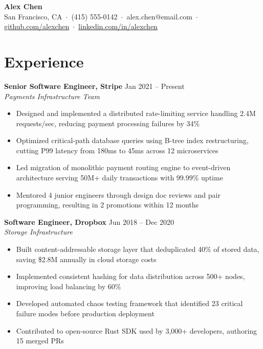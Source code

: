 \documentclass[11pt,letterpaper]{article}
\begin{document}
\begin{center}
{\LARGE \textbf{Alex Chen}} \\[4pt]
{\small San Francisco, CA \,$\cdot$\, (415) 555-0142 \,$\cdot$\, alex.chen@email.com \,$\cdot$\, \href{https://github.com/alexchen}{github.com/alexchen} \,$\cdot$\, \href{https://linkedin.com/in/alexchen}{linkedin.com/in/alexchen}}
\end{center}

\section{Experience}

\textbf{Senior Software Engineer, Stripe} \hfill {\color{accent}\small Jan 2021 -- Present} \\
{\small\itshape Payments Infrastructure Team}
\begin{itemize}
    \item Designed and implemented a distributed rate-limiting service handling 2.4M requests/sec, reducing payment processing failures by 34\%
    \item Optimized critical-path database queries using B-tree index restructuring, cutting P99 latency from 180ms to 45ms across 12 microservices
    \item Led migration of monolithic payment routing engine to event-driven architecture serving 50M+ daily transactions with 99.99\% uptime
    \item Mentored 4 junior engineers through design doc reviews and pair programming, resulting in 2 promotions within 12 months
\end{itemize}

\textbf{Software Engineer, Dropbox} \hfill {\color{accent}\small Jun 2018 -- Dec 2020} \\
{\small\itshape Storage Infrastructure}
\begin{itemize}
    \item Built content-addressable storage layer that deduplicated 40\% of stored data, saving \$2.8M annually in cloud storage costs
    \item Implemented consistent hashing for data distribution across 500+ nodes, improving load balancing by 60\%
    \item Developed automated chaos testing framework that identified 23 critical failure modes before production deployment
    \item Contributed to open-source Rust SDK used by 3,000+ developers, authoring 15 merged PRs
\end{itemize}
\end{document}
